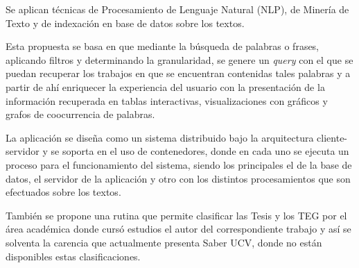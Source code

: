 Se aplican técnicas de Procesamiento de Lenguaje Natural (NLP), de Minería de Texto y de indexación en base de datos sobre los textos.

Esta propuesta se basa en que mediante la búsqueda de palabras o frases, aplicando filtros y determinando la granularidad, se genere un \textit {query} con el que se puedan recuperar los trabajos en que se encuentran contenidas tales palabras y  a partir de ahí enriquecer la experiencia del usuario con la presentación de la información recuperada en tablas interactivas, visualizaciones con gráficos y grafos de coocurrencia de palabras.

La aplicación se diseña como un sistema distribuido bajo la arquitectura cliente-servidor y se soporta en el uso de contenedores, donde en cada uno se ejecuta un proceso para el funcionamiento del sistema, siendo los principales el de la base de datos, el servidor de la aplicación y otro con los distintos procesamientos que son efectuados sobre los textos.

También se propone una rutina que permite clasificar las Tesis y los TEG por el área académica donde cursó estudios el autor del correspondiente trabajo y así se solventa la carencia que actualmente presenta Saber UCV, donde no están disponibles estas clasificaciones.

\thispagestyle{empty}

\maketitle


